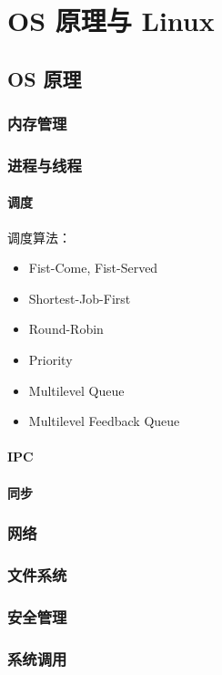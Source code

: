\chapter{OS 原理与 Linux}

\section{OS 原理}

\subsection{内存管理}
\subsection{进程与线程}
\subsubsection{调度}

调度算法：
\begin{itemize}
  \item Fist-Come, Fist-Served
  \item Shortest-Job-First
  \item Round-Robin
  \item Priority
  \item Multilevel Queue
  \item Multilevel Feedback Queue
\end{itemize}


\subsubsection{IPC}
\subsubsection{同步}
\subsection{网络}
\subsection{文件系统}
\subsection{安全管理}
\subsection{系统调用}

